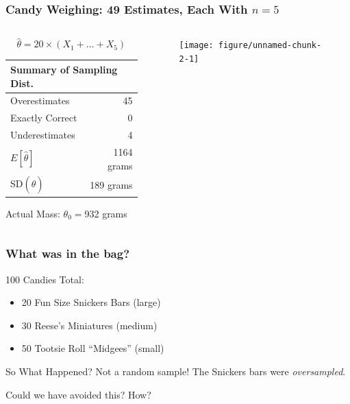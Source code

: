\begin{frame}[fragile]



\frametitle{Candy Weighing: 49 Estimates, Each With $n=5$}

\begin{columns} 
\begin{column}[c]{5cm} 
\small

$$\widehat{\theta} = 20 \times (X_1 + \hdots + X_5)$$

\small
   \begin{tabular}{lr}
   \hline \hline
   \multicolumn{2}{l}{Summary of Sampling Dist.} \\
   \hline
   Overestimates& 45\\
   Exactly Correct& 0\\
   Underestimates& 4\\
   \hline
   $E[\hat{\theta}]$& 1164 grams\\
   SD$(\widehat{\theta})$& 189 grams\\
   \hline
   \end{tabular}
   
  \vspace{1em}
  Actual Mass:  $\theta_0 =$932 grams
\end{column} 
\begin{column}[c]{5cm} 

\begin{figure}
\centering
\begin{knitrout}
\color{fgcolor}

{\centering \texttt{[image: figure/unnamed-chunk-2-1]} 

}



\end{knitrout}


\end{figure}

\end{column} 
\end{columns} 


\end{frame}

\begin{frame}
\frametitle{What was in the bag?}

100 Candies Total:
\begin{itemize}
	\item 20 Fun Size Snickers Bars (large) 
	\item 30 Reese's Miniatures (medium) 
	\item 50 Tootsie Roll ``Midgees'' (small)
\end{itemize}
\begin{block}{So What Happened?}
	\pause Not a random sample! The Snickers bars were \emph{oversampled}.
\end{block}
\begin{block}{Could we have avoided this? How?}

\end{block}
\end{frame}


